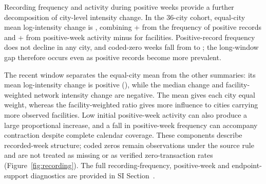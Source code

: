 \par
Recording frequency and activity during positive weeks provide a further decomposition of city-level intensity change. In the 36-city cohort, equal-city mean log-intensity change is \LongMeanI, combining +\LongMeanP{} from the frequency of positive records and +\LongMeanQ{} from positive-week activity minus \LongMeanN{} for facilities. Positive-record frequency does not decline in any city, and coded-zero weeks fall from \LongZeroStart{} to \LongZeroEnd{}; the long-window gap therefore occurs even as positive records become more prevalent.

The recent window separates the equal-city mean from the other summaries: its mean log-intensity change is positive (\RecentMeanI), while the median change and facility-weighted network intensity change are negative. The mean gives each city equal weight, whereas the facility-weighted ratio gives more influence to cities carrying more observed facilities. Low initial positive-week activity can also produce a large proportional increase, and a fall in positive-week frequency can accompany contraction despite complete calendar coverage. These components describe recorded-week structure; coded zeros remain observations under the source rule and are not treated as missing or as verified zero-transaction rates (Figure~\ref{fig:recording}). The full recording-frequency, positive-week and endpoint-support diagnostics are provided in SI Section~.

